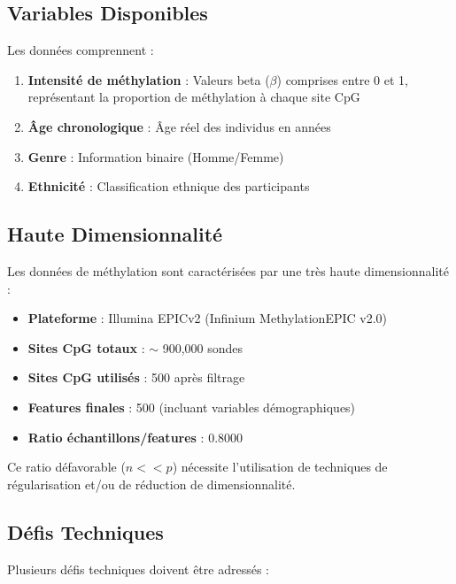 \documentclass[11pt,a4paper]{article}
\begin{document}
\subsection{Variables Disponibles}

Les données comprennent :
\begin{enumerate}
    \item \textbf{Intensité de méthylation} : Valeurs beta ($\beta$) comprises entre 0 et 1, 
          représentant la proportion de méthylation à chaque site CpG
    \item \textbf{Âge chronologique} : Âge réel des individus en années
    \item \textbf{Genre} : Information binaire (Homme/Femme)
    \item \textbf{Ethnicité} : Classification ethnique des participants
\end{enumerate}

\subsection{Haute Dimensionnalité}

Les données de méthylation sont caractérisées par une très haute dimensionnalité :
\begin{itemize}
    \item \textbf{Plateforme} : Illumina EPICv2 (Infinium MethylationEPIC v2.0)
    \item \textbf{Sites CpG totaux} : $\sim$ 900,000 sondes
    \item \textbf{Sites CpG utilisés} : 500 après filtrage
    \item \textbf{Features finales} : 500 (incluant variables démographiques)
    \item \textbf{Ratio échantillons/features} : 0.8000
\end{itemize}

Ce ratio défavorable ($n << p$) nécessite l'utilisation de techniques de régularisation 
et/ou de réduction de dimensionnalité.

\subsection{Défis Techniques}

Plusieurs défis techniques doivent être adressés :
\end{document}
